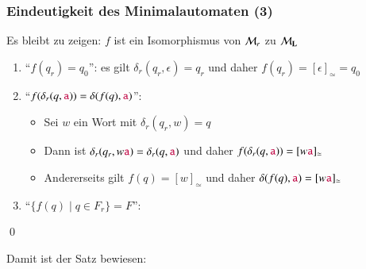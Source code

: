 \documentclass[aspectratio=1610,onlymath]{beamer}
\begin{document}
\begin{frame}[t]\frametitle{Eindeutigkeit des Minimalautomaten (3)}

Es bleibt zu zeigen: $f$ ist ein Isomorphismus von $\mathcal{M}_r$ zu $\mathcal{M}_{\textbf{\textcolor{black}{L}}}$\pause

\begin{enumerate}[(1)]
\item "`$f(q_r)=q_0$"': \pause es gilt $\delta_r(q_r,\epsilon)=q_r$ und daher $f(q_r)=[\epsilon]_\simeq=q_0$ \pause
\item "`$f(\delta_r(q,\mathtt{\textcolor{purple}{a}})) = \delta(f(q),\mathtt{\textcolor{purple}{a}})$"': \pause
	\begin{itemize}
	\item Sei $w$ ein Wort mit $\delta_r(q_r,w)=q$\pause
	\item Dann ist $\delta_r(q_r,w\mathtt{\textcolor{purple}{a}})=\delta_r(q,\mathtt{\textcolor{purple}{a}})$ und daher $f(\delta_r(q,\mathtt{\textcolor{purple}{a}}))=[w\mathtt{\textcolor{purple}{a}}]_\simeq$\pause
	\item Andererseits gilt $f(q)=[w]_\simeq$ und daher $\delta(f(q),\mathtt{\textcolor{purple}{a}})=[w\mathtt{\textcolor{purple}{a}}]_\simeq$
	\end{itemize}\pause
\item "`$\{f(q)\mid q\in F_r\}=F$"': \pause
\end{enumerate}
\pause

\qed
\bigskip

Damit ist der Satz bewiesen:\smallskip


\end{frame}
\end{document}
